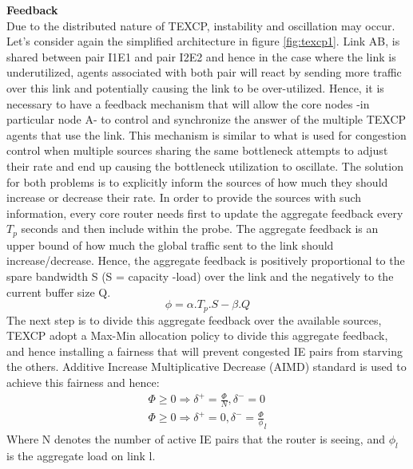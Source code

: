 {\bf Feedback}
\\Due to the distributed nature of TEXCP, instability and oscillation may occur. Let's consider again the simplified architecture in figure \ref{fig:texcp1}. Link AB, is shared between pair I1E1 and pair I2E2 and hence in the case where the link is underutilized, agents associated with both pair will react by sending more traffic over this link and potentially causing the link to be over-utilized. Hence, it is necessary to have a feedback mechanism that will allow the core nodes -in particular node A-  to control and synchronize the answer of the multiple TEXCP agents that use the link. This mechanism is similar to what is used for congestion control when multiple sources sharing the same bottleneck attempts to adjust their rate and end up causing the bottleneck utilization to oscillate. The solution for both problems is to explicitly inform the sources of how much they should increase or decrease their rate. In order to provide the sources with such information, every core router needs first to update the aggregate feedback every $T_{p}$ seconds and then include within the probe. The aggregate feedback is an upper bound of how much the global traffic sent to the link should increase/decrease. Hence, the aggregate feedback is positively proportional to the spare bandwidth S (S = capacity -load) over the link and the negatively to the current buffer size Q.
\begin {equation}
\phi = \alpha . T_{p} . S - \beta . Q
\end {equation}
The next step is to divide this aggregate feedback over the available sources, TEXCP adopt a Max-Min allocation policy to divide this aggregate feedback, and hence installing a fairness that will prevent congested IE pairs from starving the others. Additive Increase Multiplicative Decrease (AIMD) standard is used to achieve this fairness and hence: 
\begin {eqnarray}
\Phi \ge 0 \Rightarrow \delta^+ = \frac{\Phi} {N}, \delta^- = 0 \\
\Phi \ge 0 \Rightarrow \delta^+ = 0 , \delta^- = \frac{\Phi} \phi_l
\end {eqnarray}
Where N denotes the number of active IE pairs that the router is seeing, and $\phi_l$ is the aggregate load on link l.

